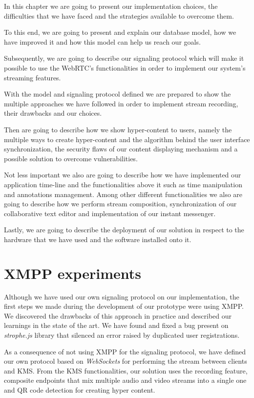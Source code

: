 
In this chapter we are going to present our implementation choices, the difficulties that we have faced and the strategies available to overcome them.

To this end, we are going to present and explain our database model, how we have improved it and how this model can help us reach our goals. 

Subsequently, we are going to describe our signaling protocol which will make it possible to use the \ac{WebRTC}'s functionalities in order to implement our system's streaming features.

With the model and signaling protocol defined we are prepared to show the multiple approaches we have followed in order to implement stream recording, their drawbacks and our choices.

Then are going to describe how we show hyper-content to users, namely the multiple ways to create hyper-content and the algorithm behind the user interface synchronization, the security flaws of our content displaying mechanism and a possible solution to overcome vulnerabilities. 

Not less important we also are going to describe how we have implemented our application time-line and the functionalities above it such as time manipulation and annotations management. Among other different functionalities we also are going to describe how we perform stream composition, synchronization of our collaborative text editor and implementation of our instant messenger.

Lastly, we are going to describe the deployment of our solution in respect to the hardware that we have used and the software installed onto it.




\section{XMPP experiments}
Although we have used our own signaling protocol on our implementation, the first steps we made during the development of our prototype were using \ac{XMPP}. We discovered the drawbacks of this approach in practice and described our learnings in the state of the art. We have found and fixed a bug present on \emph{strophe.js} library that silenced an error raised by duplicated user registrations.

As a consequence of not using \ac{XMPP} for the signaling protocol, we have defined our own protocol based on \emph{WebSockets} for performing the stream between clients and \ac{KMS}. From the \ac{KMS} functionalities, our solution uses the recording feature, composite endpoints that mix multiple audio and video streams into a single one and \ac{QR} code detection for creating hyper content.





